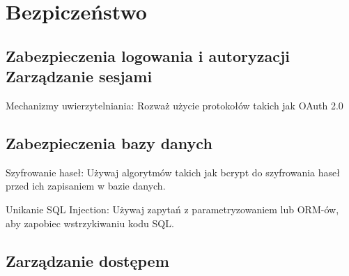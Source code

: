 \documentclass[12pt,titlepage]{article}
\begin{document}
\section{Bezpiczeństwo}
\subsection{Zabezpieczenia logowania i autoryzacji Zarządzanie sesjami}
Mechanizmy uwierzytelniania: Rozważ użycie protokołów takich jak OAuth 2.0
\subsection{Zabezpieczenia bazy danych}
Szyfrowanie haseł: Używaj algorytmów takich jak bcrypt do szyfrowania haseł przed ich zapisaniem w bazie danych.

Unikanie SQL Injection: Używaj zapytań z parametryzowaniem lub ORM-ów, aby zapobiec wstrzykiwaniu kodu SQL.
\subsection{Zarządzanie dostępem}

    
\end{document}
